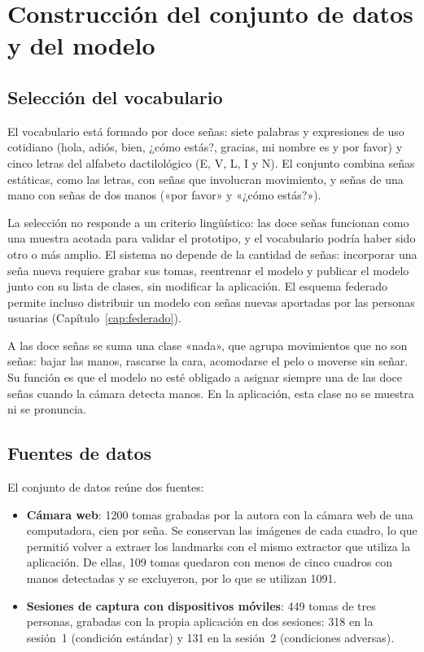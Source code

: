 \chapter{Construcción del conjunto de datos y del modelo}
\label{cap:dataset-modelo}

\section{Selección del vocabulario}

El vocabulario está formado por doce señas: siete palabras y expresiones de uso cotidiano (hola, adiós, bien, ¿cómo estás?, gracias, mi nombre es y por favor) y cinco letras del alfabeto dactilológico (E, V, L, I y N). El conjunto combina señas estáticas, como las letras, con señas que involucran movimiento, y señas de una mano con señas de dos manos («por favor» y «¿cómo estás?»).

La selección no responde a un criterio lingüístico: las doce señas funcionan como una muestra acotada para validar el prototipo, y el vocabulario podría haber sido otro o más amplio. El sistema no depende de la cantidad de señas: incorporar una seña nueva requiere grabar sus tomas, reentrenar el modelo y publicar el modelo junto con su lista de clases, sin modificar la aplicación. El esquema federado permite incluso distribuir un modelo con señas nuevas aportadas por las personas usuarias (Capítulo~\ref{cap:federado}).

A las doce señas se suma una clase «nada», que agrupa movimientos que no son señas: bajar las manos, rascarse la cara, acomodarse el pelo o moverse sin señar. Su función es que el modelo no esté obligado a asignar siempre una de las doce señas cuando la cámara detecta manos. En la aplicación, esta clase no se muestra ni se pronuncia.

\section{Fuentes de datos}

El conjunto de datos reúne dos fuentes:

\begin{itemize}
    \item \textbf{Cámara web}: 1200 tomas grabadas por la autora con la cámara web de una computadora, cien por seña. Se conservan las imágenes de cada cuadro, lo que permitió volver a extraer los landmarks con el mismo extractor que utiliza la aplicación. De ellas, 109 tomas quedaron con menos de cinco cuadros con manos detectadas y se excluyeron, por lo que se utilizan 1091.
    \item \textbf{Sesiones de captura con dispositivos móviles}: 449 tomas de tres personas, grabadas con la propia aplicación en dos sesiones: 318 en la sesión~1 (condición estándar) y 131 en la sesión~2 (condiciones adversas).
\end{itemize}

